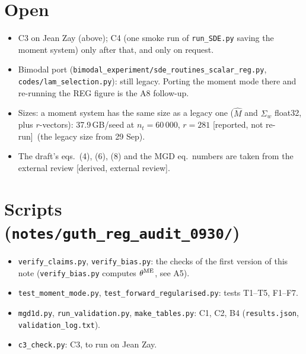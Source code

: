 \documentclass[11pt,a4paper]{article}
\newcommand{\code}[1]{\texttt{#1}}
\newcommand{\rep}{\textcolor{blue!70!black}{\textsf{[reported, not re-run]}}}
\newcommand{\ext}{\textcolor{purple!80!black}{\textsf{[derived, external review]}}}
\begin{document}
\section{Open}\label{sec:open}
\begin{itemize}
  \item C3 on Jean Zay (above); C4 (one smoke run of \code{run\_SDE.py} saving the moment system) only after that, and only on request.
  \item Bimodal port (\code{bimodal\_experiment/sde\_routines\_scalar\_reg.py}, \code{codes/lam\_selection.py}): still legacy. Porting the moment mode there
        and re-running the REG figure is the A8 follow-up.
  \item Sizes: a moment system has the same size as a legacy one ($\hat M$ and $\hat\Sigma_w$ float32, plus $r$-vectors): 37.9\,GB/seed at $n_t=60\,000$,
        $r=281$ \rep\ (the legacy size from 29 Sep).
  \item The draft's eqs.~(4), (6), (8) and the MGD eq.~numbers are taken from the external review \ext.
\end{itemize}

\appendix
\section{Scripts (\code{notes/guth\_reg\_audit\_0930/})}
\begin{itemize}
\item \code{verify\_claims.py}, \code{verify\_bias.py}: the checks of the first version of this note (\code{verify\_bias.py} computes $\theta^{\rm ME}$, see A5).
\item \code{test\_moment\_mode.py}, \code{test\_forward\_regularised.py}: tests T1--T5, F1--F7.
\item \code{mgd1d.py}, \code{run\_validation.py}, \code{make\_tables.py}: C1, C2, B4 (\code{results.json}, \code{validation\_log.txt}).
\item \code{c3\_check.py}: C3, to run on Jean Zay.
\end{itemize}
\end{document}
